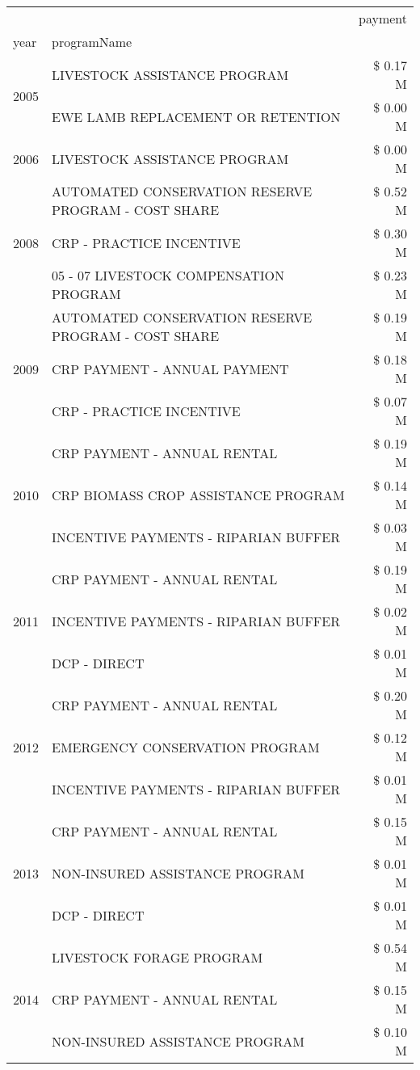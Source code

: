 \begin{tabular}{llr}
\toprule
 &  & payment \\
year & programName &  \\
\midrule
\multirow[t]{2}{*}{2005} & LIVESTOCK ASSISTANCE PROGRAM & \$ 0.17 M \\
 & EWE LAMB REPLACEMENT OR RETENTION & \$ 0.00 M \\
\cline{1-3}
2006 & LIVESTOCK ASSISTANCE PROGRAM & \$ 0.00 M \\
\cline{1-3}
\multirow[t]{3}{*}{2008} & AUTOMATED CONSERVATION RESERVE PROGRAM - COST SHARE & \$ 0.52 M \\
 & CRP - PRACTICE INCENTIVE & \$ 0.30 M \\
 & 05 - 07 LIVESTOCK COMPENSATION PROGRAM & \$ 0.23 M \\
\cline{1-3}
\multirow[t]{3}{*}{2009} & AUTOMATED CONSERVATION RESERVE PROGRAM - COST SHARE & \$ 0.19 M \\
 & CRP PAYMENT - ANNUAL PAYMENT & \$ 0.18 M \\
 & CRP - PRACTICE INCENTIVE & \$ 0.07 M \\
\cline{1-3}
\multirow[t]{3}{*}{2010} & CRP PAYMENT - ANNUAL RENTAL & \$ 0.19 M \\
 & CRP BIOMASS CROP ASSISTANCE PROGRAM & \$ 0.14 M \\
 & INCENTIVE PAYMENTS - RIPARIAN BUFFER & \$ 0.03 M \\
\cline{1-3}
\multirow[t]{3}{*}{2011} & CRP PAYMENT - ANNUAL RENTAL & \$ 0.19 M \\
 & INCENTIVE PAYMENTS - RIPARIAN BUFFER & \$ 0.02 M \\
 & DCP - DIRECT & \$ 0.01 M \\
\cline{1-3}
\multirow[t]{3}{*}{2012} & CRP PAYMENT - ANNUAL RENTAL & \$ 0.20 M \\
 & EMERGENCY CONSERVATION PROGRAM & \$ 0.12 M \\
 & INCENTIVE PAYMENTS - RIPARIAN BUFFER & \$ 0.01 M \\
\cline{1-3}
\multirow[t]{3}{*}{2013} & CRP PAYMENT - ANNUAL RENTAL & \$ 0.15 M \\
 & NON-INSURED ASSISTANCE PROGRAM & \$ 0.01 M \\
 & DCP - DIRECT & \$ 0.01 M \\
\cline{1-3}
\multirow[t]{3}{*}{2014} & LIVESTOCK FORAGE PROGRAM & \$ 0.54 M \\
 & CRP PAYMENT - ANNUAL RENTAL & \$ 0.15 M \\
 & NON-INSURED ASSISTANCE PROGRAM & \$ 0.10 M \\

\end{tabular}
